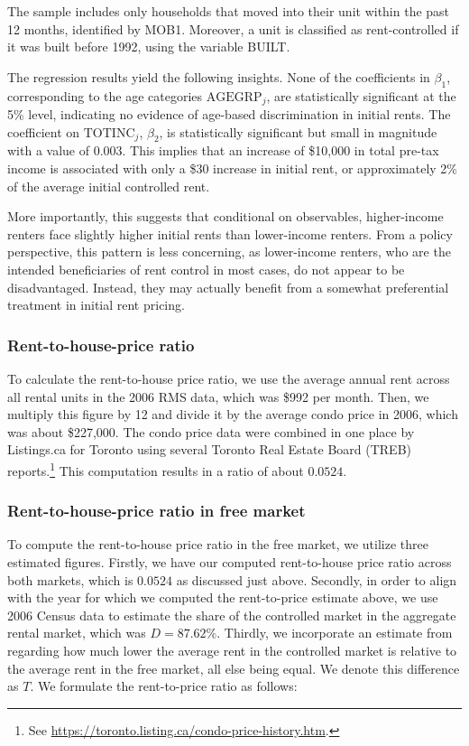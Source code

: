 The sample includes only households that moved into their unit within the past 12 months, identified by MOB1. Moreover, a unit is classified as rent-controlled if it was built before 1992, using the variable BUILT.

The regression results yield the following insights. None of the coefficients in $\beta_1$, corresponding to the age categories $\text{AGEGRP}_j$, are statistically significant at the 5\% level, indicating no evidence of age-based discrimination in initial rents. The coefficient on $\text{TOTINC}_j$, $\beta_2$, is statistically significant but small in magnitude with a value of 0.003. This implies that an increase of \$10,000 in total pre-tax income is associated with only a \$30 increase in initial rent, or approximately 2\% of the average initial controlled rent.

More importantly, this suggests that conditional on observables, higher-income renters face slightly higher initial rents than lower-income renters. From a policy perspective, this pattern is less concerning, as lower-income renters, who are the intended beneficiaries of rent control in most cases, do not appear to be disadvantaged. Instead, they may actually benefit from a somewhat preferential treatment in initial rent pricing.

\subsubsection{Rent-to-house-price ratio}

To calculate the rent-to-house price ratio, we use the average annual rent across all rental units in the 2006 RMS data, which was \$992 per month. Then, we multiply this figure by 12 and divide it by the average condo price in 2006, which was about \$227,000. The condo price data were combined in one place by Listings.ca for Toronto using several Toronto Real Estate Board (TREB) reports.\footnote{See \url{https://toronto.listing.ca/condo-price-history.htm}.} This computation results in a ratio of about $0.0524$.

\subsubsection{Rent-to-house-price ratio in free market}

To compute the rent-to-house price ratio in the free market, we utilize three estimated figures. Firstly, we have our computed rent-to-house price ratio across both markets, which is $0.0524$ as discussed just above. Secondly, in order to align with the year for which we computed the rent-to-price estimate above, we use 2006 Census data to estimate the share of the controlled market in the aggregate rental market, which was $D=87.62\%$. Thirdly, we incorporate an estimate from \citet{zhang-gou} regarding how much lower the average rent in the controlled market is relative to the average rent in the free market, all else being equal. We denote this difference as $T$. We formulate the rent-to-price ratio as follows:

